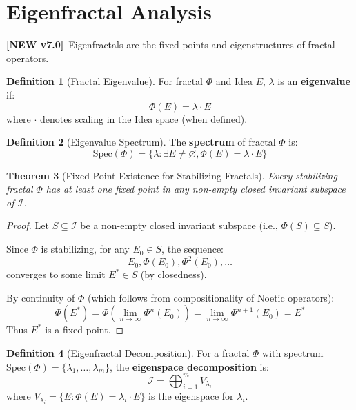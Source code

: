 \documentclass[11pt,twoside,openright]{book}
\theoremstyle{definition}
\newtheorem{definition}{Definition}[chapter]
\theoremstyle{plain}
\newtheorem{theorem}[definition]{Theorem}
\theoremstyle{remark}
\newcommand{\Ideas}{\mathcal{I}}
\newcommand{\Frac}{\Phi}
\newcommand{\Spec}{\mathrm{Spec}}
\newcommand{\vnew}{\textcolor{blue!70!black}{\textbf{[NEW v7.0]}}}
\begin{document}
\section{Eigenfractal Analysis}
\label{sec:eigenfractals}

\vnew\ Eigenfractals are the fixed points and eigenstructures of fractal operators.

\begin{definition}[Fractal Eigenvalue]
\label{def:fractal-eigenvalue}
For fractal $\Frac$ and Idea $E$, $\lambda$ is an \textbf{eigenvalue} if:
\[
\Frac(E) = \lambda \cdot E
\]
where $\cdot$ denotes scaling in the Idea space (when defined).
\end{definition}

\begin{definition}[Eigenvalue Spectrum]
\label{def:eigenvalue-spectrum}
The \textbf{spectrum} of fractal $\Frac$ is:
\[
\Spec(\Frac) = \{\lambda : \exists E \neq \varnothing, \Frac(E) = \lambda \cdot E\}
\]
\end{definition}

\begin{theorem}[Fixed Point Existence for Stabilizing Fractals]
\label{thm:stabilizing-fixpoint}
Every stabilizing fractal $\Frac$ has at least one fixed point in any non-empty closed invariant subspace of $\Ideas$.
\end{theorem}

\begin{proof}
Let $S \subseteq \Ideas$ be a non-empty closed invariant subspace (i.e., $\Frac(S) \subseteq S$).

Since $\Frac$ is stabilizing, for any $E_0 \in S$, the sequence:
\[
E_0, \Frac(E_0), \Frac^2(E_0), \ldots
\]
converges to some limit $E^* \in S$ (by closedness).

By continuity of $\Frac$ (which follows from compositionality of Noetic operators):
\[
\Frac(E^*) = \Frac(\lim_{n \to \infty} \Frac^n(E_0)) = \lim_{n \to \infty} \Frac^{n+1}(E_0) = E^*
\]
Thus $E^*$ is a fixed point.
\end{proof}

\begin{definition}[Eigenfractal Decomposition]
\label{def:eigen-decomposition}
For a fractal $\Frac$ with spectrum $\Spec(\Frac) = \{\lambda_1, \ldots, \lambda_m\}$, the \textbf{eigenspace decomposition} is:
\[
\Ideas = \bigoplus_{i=1}^{m} V_{\lambda_i}
\]
where $V_{\lambda_i} = \{E : \Frac(E) = \lambda_i \cdot E\}$ is the eigenspace for $\lambda_i$.
\end{definition}
\end{document}
